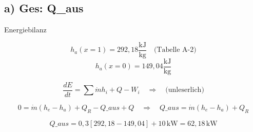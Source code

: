 \subsection*{a) Ges: Q\_aus}

Energiebilanz

\[
h_{a}(x=1) = 292,18 \frac{\text{kJ}}{\text{kg}} \quad \text{(Tabelle A-2)}
\]
\[
h_{a}(x=0) = 149,04 \frac{\text{kJ}}{\text{kg}}
\]

\[
\frac{dE}{dt} = \sum \dot{m} h_i + Q - W_i \quad \Rightarrow \quad \text{(unleserlich)}
\]

\[
0 = \dot{m} (h_e - h_a) + Q_R - Q\_aus + Q \quad \Rightarrow \quad Q\_aus = \dot{m} (h_e - h_a) + Q_R
\]

\[
Q\_aus = 0,3 \left[ 292,18 - 149,04 \right] + 10\,\text{kW} = 62,18\,\text{kW}
\]